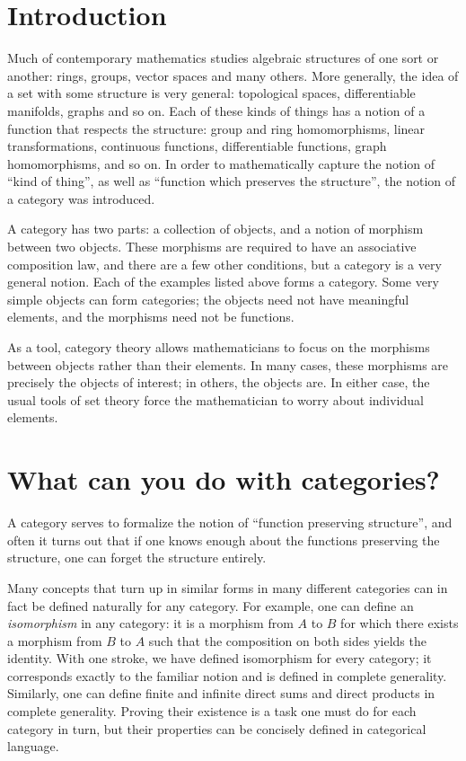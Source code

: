\documentclass[12pt]{article}
\begin{document}
\raggedbottom
\section*{Introduction}

Much of contemporary mathematics studies algebraic structures of one sort or another: rings, groups, vector spaces and many others.  More generally, the idea of a set with some structure is very general: topological spaces, differentiable manifolds, graphs and so on.  Each of these kinds of things has a notion of a function that respects the structure: group and ring homomorphisms, linear transformations, continuous functions, differentiable functions, graph homomorphisms, and so on.  In order to mathematically capture the notion of ``kind of thing'', as well as ``function which preserves the structure'', the notion of a category was introduced.

A category has two parts: a collection of objects, and a notion of morphism between two objects.  These morphisms are required to have an associative composition law, and there are a few other conditions, but a category is a very general notion.  Each of the examples listed above forms a category.  Some very simple objects can form categories; the objects need not have meaningful elements, and the morphisms need not be functions.  

As a tool, category theory allows mathematicians to focus on the morphisms between objects rather than their elements.  In many cases, these morphisms are precisely the objects of interest; in others, the objects are.  In either case, the usual tools of set theory force the mathematician to worry about individual elements.

\section*{What can you do with categories?}

A category serves to formalize the notion of ``function preserving structure'', and often it turns out that if one knows enough about the functions preserving the structure, one can forget the structure entirely.  

Many concepts that turn up in similar forms in many different categories can in fact be defined naturally for any category.  For example, one can define an \emph{isomorphism} in any category: it is a morphism from $A$ to $B$ for which there exists a morphism from $B$ to $A$ such that the composition on both sides yields the identity.  With one stroke, we have defined isomorphism for every category; it corresponds exactly to the familiar notion and is defined in complete generality.  Similarly, one can define finite and infinite direct sums and direct products in complete generality.  Proving their existence is a task one must do for each category in turn, but their properties can be concisely defined in categorical language. 
\end{document}
